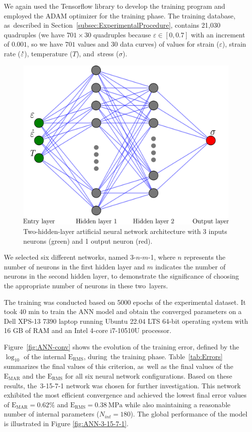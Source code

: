 \documentclass[metals,article,accept,pdftex,moreauthors]{Definitions/mdpi}
\DeclareRobustCommand{\mdot}[1]{\accentset{\mbox{\bfseries .}}{#1}}
\DeclareRobustCommand{\RMSE}{\text{E}_\text{RMS}}
\DeclareRobustCommand{\MARE}{\text{E}_\text{MAR}}
\DeclareRobustCommand{\MPa}{\text{MPa}}
\begin{document}
We again used the Tensorflow library to develop the training program and employed the ADAM optimizer for the training phase.
The training database, as~described in \mbox{Section~\ref{subsec:ExperimentalProcedure}}, contains 21,030 quadruples (we have $701\times30$ quadruples because $\varepsilon\in[0,0.7]$ with an increment of $0.001$, so we have $701$ values and 30 data curves) of values for strain ($\varepsilon$), strain rate ($\mdot\varepsilon$), temperature ($T$), and~stress ($\sigma$).
\begin{figure}[H]
\centering
\includegraphics[width=0.55\columnwidth]{Figures/ANN-scheme-2HL}
\caption{Two-hidden-layer artificial neural network architecture with 3 inputs neurons (green) and 1 output neuron (red).}
\label{fig:ANN-2HL}
\end{figure}



We selected six different networks, named 3-$n$-$m$-1, where $n$ represents the number of neurons in the first hidden layer and $m$ indicates the number of neurons in the second hidden layer, to demonstrate the significance of choosing the appropriate number of neurons in these two~layers.

The training was conducted based on 5000 epochs of the experimental dataset.
It took 40 min to train the ANN model and obtain the converged parameters on a Dell XPS-13 7390 laptop running Ubuntu 22.04 LTS 64-bit operating system with 16 GB of RAM and an Intel 4-core i7-10510U processor.

Figure~\ref{fig:ANN-conv} shows the evolution of the training error, defined by the $\log_{10}$ of the internal $\RMSE$, during~the training phase.
Table~\ref{tab:Errors} summarizes the final values of this criterion, as~well as the final values of the $\MARE$ and the $\RMSE$ for all six neural network configurations.
\linebreak Based on these results, the~3-15-7-1 network was chosen for further investigation.
\linebreak This network exhibited the most efficient convergence and achieved the lowest final error values of $\MARE=0.62\%$ and $\RMSE=0.38~\MPa$ while also maintaining a reasonable number of internal parameters ($N_{int}=180$).
The global performance of the model is illustrated in Figure \ref{fig:ANN-3-15-7-1}. %
\end{document}
